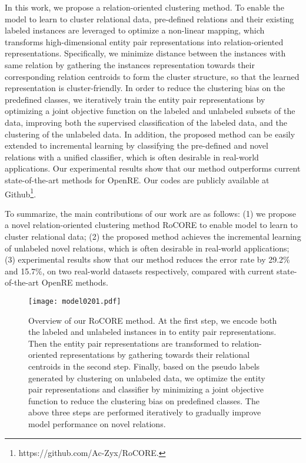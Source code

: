 \documentclass[11pt]{article}
\begin{document}
    In this work, we propose a relation-oriented clustering method. To enable the model to learn to cluster relational data, pre-defined relations and their existing labeled instances are leveraged to optimize a non-linear mapping, which transforms high-dimensional entity pair representations into relation-oriented representations. Specifically, we minimize distance between the instances with same relation by gathering the instances representation towards their corresponding relation centroids to form the cluster structure, so that the learned representation is cluster-friendly. In order to reduce the clustering bias on the predefined classes, we iteratively train the entity pair representations by optimizing a joint objective function on the labeled and unlabeled subsets of the data, improving both the supervised classification of the labeled data, and the clustering of the unlabeled data. In addition, the proposed method can be easily extended to incremental learning by classifying the pre-defined and novel relations with a unified classifier, which is often desirable in real-world applications. Our experimental results show that our method outperforms current state-of-the-art methods for OpenRE. Our codes are publicly available at Github\footnote{https://github.com/Ac-Zyx/RoCORE.}.



    To summarize, the main contributions of our work are as follows: (1) we propose a novel relation-oriented clustering method RoCORE to enable model to learn to cluster relational data; (2) the proposed method achieves the incremental learning of unlabeled novel relations, which is often desirable in real-world applications; (3) experimental results show that our method reduces the error rate by 29.2\% and 15.7\%, on two real-world datasets respectively, compared with current state-of-the-art OpenRE methods. \begin{figure*}[t]
    \centering
        \texttt{[image: model0201.pdf]}
        \caption{Overview of our RoCORE method. At the first step, we encode both the labeled and unlabeled instances in to entity pair representations. Then the entity pair representations are transformed to relation-oriented representations by gathering towards their relational centroids in the second step. Finally, based on the pseudo labels generated by clustering on unlabeled data, we optimize the entity pair representations and classifier by minimizing a joint objective function to reduce the clustering bias on predefined classes. The above three steps are performed iteratively to gradually improve model performance on novel relations.}
        \label{fig:model}
    \end{figure*}  
    
\end{document}
